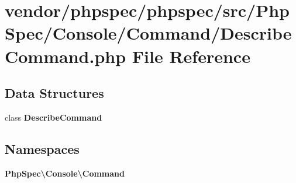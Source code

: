 \section{vendor/phpspec/phpspec/src/\+Php\+Spec/\+Console/\+Command/\+Describe\+Command.php File Reference}
\label{_describe_command_8php}
\subsection*{Data Structures}
\begin{DoxyCompactItemize}
\item 
class {\bf Describe\+Command}
\end{DoxyCompactItemize}
\subsection*{Namespaces}
\begin{DoxyCompactItemize}
\item 
 {\bf Php\+Spec\textbackslash{}\+Console\textbackslash{}\+Command}
\end{DoxyCompactItemize}
